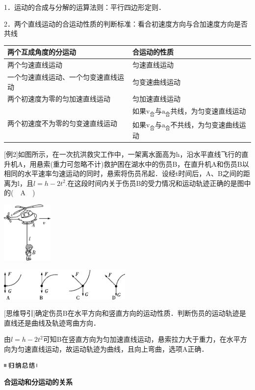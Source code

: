 \documentclass[cn,10.5pt,chinese,mac,chinesefont=founder]{elegantbook}
\begin{document}
1．运动的合成与分解的运算法则：平行四边形定则．

2．两个直线运动的合运动性质的判断标准：看合初速度方向与合加速度方向是否共线

\begin{longtable}[]{@{}ll@{}}
\toprule
两个互成角度的分运动 & 合运动的性质\tabularnewline
\midrule
\endhead
两个匀速直线运动 & 匀速直线运动\tabularnewline
一个匀速直线运动、一个匀变速直线运动 & 匀变速曲线运动\tabularnewline
两个初速度为零的匀加速直线运动 & 匀加速直线运动\tabularnewline
\multirow{2}{6cm}{两个初速度不为零的匀变速直线运动}
 &
如果$\mathrm v_{\text{合}}$与$\mathrm a_{\text{合}}$共线，为匀变速直线运动\tabularnewline
& 如果$\mathrm v_{\text{合}}$与$\mathrm a_{\text{合}}$不共线，为匀变速曲线运动\tabularnewline
\bottomrule
\end{longtable}

{[}例2{]}如图所示，在一次抗洪救灾工作中，一架离水面高为h，沿水平直线飞行的直升机A，用悬索(重力可忽略不计)救护困在湖水中的伤员B，在直升机A和伤员B以相同的水平速率匀速运动的同时，悬索将伤员吊起．设经t时间后，A、B之间的距离为l，且$l=h-2t^2$.在这段时间内关于伤员B的受力情况和运动轨迹正确的是图中的(　A　)

\begin{center}\includegraphics[width=0.98958in,height=1.1875in]{media/image143.png}\end{center}
\begin{center}\includegraphics[width=2.57292in,height=0.625in]{media/image144.png}\end{center}
{[}思维导引{]}确定伤员B在水平方向和竖直方向的运动性质．判断伤员的运动轨迹是直线还是曲线及轨迹弯曲方向．
\begin{solution}
	由$l=h-2t^2$可知B在竖直方向为匀加速直线运动，悬索拉力大于重力，在水平方向为匀速直线运动，故运动轨迹为曲线，且向上弯曲，选项A正确．
\end{solution}


\begin{center}\includegraphics[width=0.70833in,height=0.125in]{media/image13.png}

\textbf{合运动和分运动的关系}
\end{center}
\end{document}
